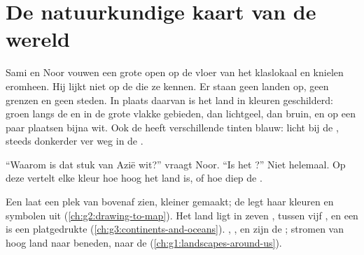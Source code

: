 \chapter{De natuurkundige kaart van de wereld}\label{ch:g4:world-physical-map}

Sami en Noor vouwen een grote  open op de vloer van het
klaslokaal en knielen eromheen. Hij lijkt niet op de  die ze kennen.
Er staan geen landen op, geen grenzen en geen steden. In plaats daarvan is
het land in kleuren geschilderd: groen langs de  en in de grote vlakke
gebieden, dan lichtgeel, dan bruin, en op een paar plaatsen bijna wit. Ook
de  heeft verschillende tinten blauw: licht bij de , steeds
donkerder ver weg in de .

``Waarom is dat stuk van Azië wit?'' vraagt Noor. ``Is het ?'' Niet
helemaal. Op deze  vertelt elke kleur hoe hoog het land is, of hoe
diep de .

\begin{recall}
Een  laat een plek van bovenaf zien, kleiner gemaakt; de  legt
haar kleuren en symbolen uit (\cref{ch:g2:drawing-to-map}). Het land ligt
in zeven , tussen vijf , en een  is een
platgedrukte  (\cref{ch:g3:continents-and-oceans}). , ,
 en  zijn de ;  stromen van hoog land naar
beneden, naar de  (\cref{ch:g1:landscapes-around-us}).
\end{recall}

